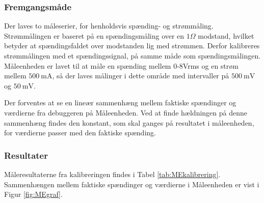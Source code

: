\subsubsection{Fremgangsmåde}

Der laves to måleserier, for henholdsvis spænding- og strømmåling. Strømmålingen er baseret på en spændingsmåling over en $1\Omega$ modstand, hvilket betyder at spændingsfaldet over modstanden lig med strømmen. Derfor kalibreres strømmålingen med et spændingssignal, på samme måde som spændingsmålingen. Måleenheden er lavet til at måle en spænding mellem 0-8Vrms og en strøm mellem $\SI{500}{\milli\ampere}$, så der laves målinger i dette område med intervaller på $\SI{500}{\milli\volt}$ og $\SI{50}{\milli\volt}$.

Der forventes at se en lineær sammenhæng mellem faktiske spændinger og værdierne fra debuggeren på Måleenheden. Ved at finde hældningen på denne sammenhæng findes den konstant, som skal ganges på resultatet i måleenheden, for værdierne passer med den faktiske spænding. 

\subsubsection{Resultater}
Måleresultaterne fra kalibreringen findes i Tabel \ref{tab:MEkalibrering}. Sammenhængen mellem faktiske spændinger og værdierne i Måleenheden er vist i Figur \ref{fig:MEgraf}.

